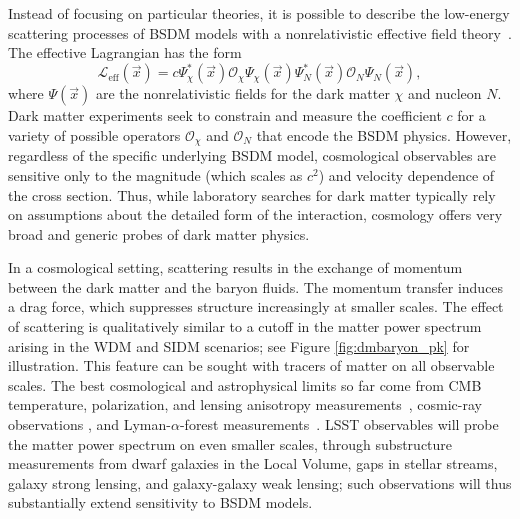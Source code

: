 Instead of focusing on particular theories, it is possible to describe the low-energy scattering processes of BSDM models with a nonrelativistic effective field theory~\cite{Fan:2010gt,Fitzpatrick:2012ix,Anand:2013yka}.
The effective Lagrangian has the form
\begin{equation}
    \mathcal{L}_\textrm{eff}(\vec{x})
    = c \Psi_\chi^\ast (\vec{x}) \mathcal{O}_\chi \Psi_\chi (\vec{x})
    \Psi_N^\ast (\vec{x}) \mathcal{O}_N \Psi_N (\vec{x}) ,
\end{equation}
where $\Psi (\vec{x})$ are the nonrelativistic fields for the dark matter $\chi$ and nucleon $N$.
Dark matter experiments seek to constrain and measure the coefficient $c$ for a variety of possible operators $\mathcal{O}_\chi$ and $\mathcal{O}_N$ that encode the BSDM physics.
However, regardless of the specific underlying BSDM model, cosmological observables are sensitive only to the magnitude (which scales as $c^2$) and velocity dependence of the cross section.
Thus, while laboratory searches for dark matter typically rely on assumptions about the detailed form of the interaction, cosmology offers very broad and generic probes of dark matter physics.

In a cosmological setting, scattering results in the exchange of momentum between the dark matter and the baryon fluids.
The momentum transfer induces a drag force, which suppresses structure increasingly at smaller scales. 
The effect of scattering is qualitatively similar to a cutoff in the matter power spectrum arising in the WDM and SIDM scenarios; see Figure \ref{fig:dmbaryon_pk} for illustration.
This feature can be sought with tracers of matter on all observable scales. 
The best cosmological and astrophysical limits so far come from CMB temperature, polarization, and lensing anisotropy measurements~\citep{Boddy:2018kfv,Gluscevic:2017ywp,Boddy:2018wzy,Xu:2018efh,Slatyer:2018aqg}, cosmic-ray observations \citep{Cappiello:2018hsu}, and Lyman-$\alpha$-forest measurements~\citep{Dvorkin:2013cea,Xu:2018efh}. 
LSST observables will probe the matter power spectrum on even smaller scales, through substructure measurements from dwarf galaxies in the Local Volume, gaps in stellar streams, galaxy strong lensing,  and galaxy-galaxy weak lensing; such observations will thus substantially extend sensitivity to BSDM models.  

